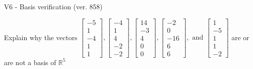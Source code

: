 \begin{exercise}
  \begin{exerciseTitle}V6 - Basis verification (ver. 858)\end{exerciseTitle}
  \begin{exerciseStatement}
    Explain why the vectors \(\left[\begin{array}{r}
-5 \\
1 \\
-4 \\
1 \\
1
\end{array}\right] , \left[\begin{array}{r}
-4 \\
1 \\
4 \\
-2 \\
-2
\end{array}\right] , \left[\begin{array}{r}
14 \\
-3 \\
4 \\
0 \\
0
\end{array}\right] , \left[\begin{array}{r}
-2 \\
0 \\
-16 \\
6 \\
6
\end{array}\right] , \text{ and } \left[\begin{array}{r}
1 \\
-5 \\
1 \\
1 \\
-2
\end{array}\right]\) are or are not a basis of \(\mathbb{R}^5\)	



\end{exerciseStatement}
\end{exercise}
